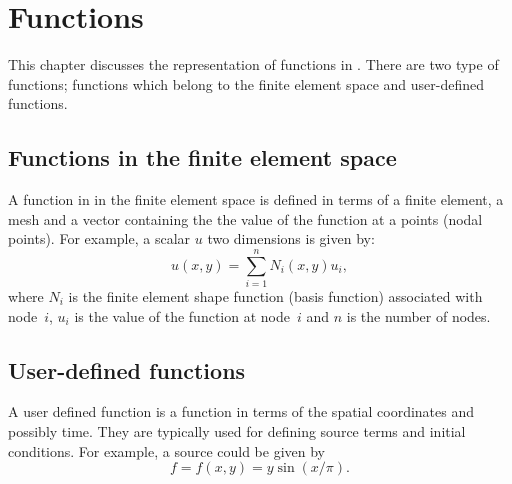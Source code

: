 \chapter{Functions}

This chapter discusses the representation of functions in \dolfin{}. There are two type of functions; functions which belong to the finite element space and user-defined functions.



\section{Functions in the finite element space}
%
A function in in the finite element space is defined in terms of a finite element, a mesh and a vector containing the the value of the function at a points (nodal points). For example, a scalar $u$ two dimensions is given by:
\begin{equation}
  u(x,y) = \sum_{i=1}^{n} N_{i}(x,y) u_{i},
\end{equation}
where $N_{i}$ is the finite element shape function (basis function) associated with 
node~$i$, $u_{i}$ is the value of the function at node~$i$ and $n$ is the number of nodes.


\section{User-defined functions}
%
A user defined function is a function in terms of the spatial coordinates and possibly time. They are typically used for defining source terms and initial conditions. For example, a source could be given by
\begin{equation}
  f = f(x,y) = y \sin(x / \pi).
\end{equation}


